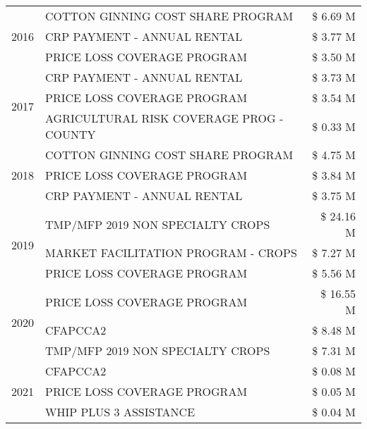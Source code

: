 \begin{tabular}{llr}
\cline{1-3}
\multirow[t]{3}{*}{2016} & COTTON GINNING COST SHARE PROGRAM & \$ 6.69 M \\
 & CRP PAYMENT - ANNUAL RENTAL & \$ 3.77 M \\
 & PRICE LOSS COVERAGE PROGRAM & \$ 3.50 M \\
\cline{1-3}
\multirow[t]{3}{*}{2017} & CRP PAYMENT - ANNUAL RENTAL & \$ 3.73 M \\
 & PRICE LOSS COVERAGE PROGRAM & \$ 3.54 M \\
 & AGRICULTURAL RISK COVERAGE PROG - COUNTY & \$ 0.33 M \\
\cline{1-3}
\multirow[t]{3}{*}{2018} & COTTON GINNING COST SHARE PROGRAM & \$ 4.75 M \\
 & PRICE LOSS COVERAGE PROGRAM & \$ 3.84 M \\
 & CRP PAYMENT - ANNUAL RENTAL & \$ 3.75 M \\
\cline{1-3}
\multirow[t]{3}{*}{2019} & TMP/MFP 2019 NON SPECIALTY CROPS & \$ 24.16 M \\
 & MARKET FACILITATION PROGRAM - CROPS & \$ 7.27 M \\
 & PRICE LOSS COVERAGE PROGRAM & \$ 5.56 M \\
\cline{1-3}
\multirow[t]{3}{*}{2020} & PRICE LOSS COVERAGE PROGRAM & \$ 16.55 M \\
 & CFAPCCA2 & \$ 8.48 M \\
 & TMP/MFP 2019 NON SPECIALTY CROPS & \$ 7.31 M \\
\cline{1-3}
\multirow[t]{3}{*}{2021} & CFAPCCA2 & \$ 0.08 M \\
 & PRICE LOSS COVERAGE PROGRAM & \$ 0.05 M \\
 & WHIP PLUS 3 ASSISTANCE & \$ 0.04 M \\
\cline{1-3}
\bottomrule
\end{tabular}
